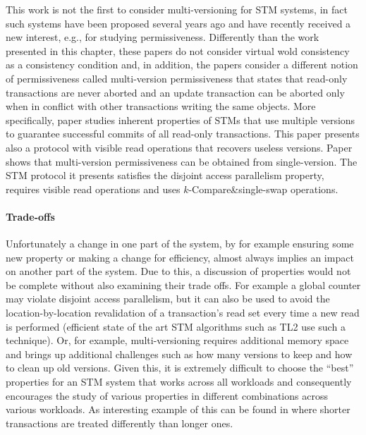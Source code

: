 This work is not the first to consider multi-versioning for STM systems, in fact
such systems
have  been  proposed  several years ago \cite{CR06} and have recently received a new interest, e.g., 
\cite{AH11,PFK10} for studying permissiveness.
Differently than the work presented in this chapter, these papers 
do not consider virtual wold consistency  as a  consistency condition and,
in addition, the papers \cite{AH11,PFK10} consider a different  notion of permissiveness
called multi-version permissiveness that states that read-only 
transactions are never aborted  and   an update transaction  can be aborted
only  when in conflict with other transactions writing the same objects.
More specifically, paper 
\cite{PFK10} studies inherent properties of STMs that use multiple 
versions    to   guarantee    successful   commits    of    all   read-only
transactions. This paper presents also a  protocol with visible read 
operations that   recovers useless versions. Paper
\cite{AH11} shows that  multi-version permissiveness can be obtained from 
single-version. The STM   protocol it presents satisfies 
the disjoint access parallelism property,  requires visible read operations
and uses $k$-Compare\&single-swap operations. 

\paragraph{Trade-offs}
Unfortunately a change in one part of the system, by for example ensuring some new property
or making a change for efficiency, almost always implies an
impact on another part of the system.
Due to this, a discussion of properties
would not be complete without also examining their trade offs.
For example a global counter may violate disjoint access parallelism, but it can
also be used to avoid the location-by-location revalidation of a transaction's read set every time a new read
is performed (efficient state of the art STM algorithms such as TL2 \cite{DSS06} use
such a technique).
Or, for example, multi-versioning requires additional memory space and brings up additional
challenges such as how many versions to keep and how to clean up old versions.
Given this, it is extremely difficult to choose the ``best'' properties for an STM system that works
across all workloads and consequently encourages the study of various properties in different
combinations across various workloads.
As interesting example of this can be found in \cite{DH12} where shorter transactions are treated
differently than longer ones.

